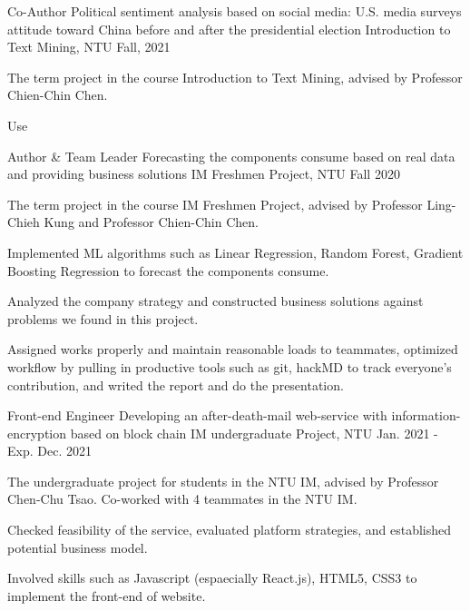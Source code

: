 \begin{cventries}
  \cventry
  {Co-Author}
  {Political sentiment analysis based on social media:
  U.S. media surveys attitude toward China before and after
  the presidential election}
  {Introduction to Text Mining, NTU}
  {Fall, 2021}
  {
      \begin{cvitems}
      \item{The term project in the course Introduction to Text Mining,
          advised by Professor Chien-Chin Chen.}
      \item{Use}
      \end{cvitems}
  }
  \cventry
    {Author \& Team Leader} %
    {Forecasting the components consume based on real data and providing business solutions} %
    {IM Freshmen Project, NTU} %
    {Fall 2020} %
    {
      \begin{cvitems} %
        \item {The term project in the course IM Freshmen Project, 
            advised by Professor Ling-Chieh Kung and Professor Chien-Chin Chen.}
        \item {Implemented ML algorithms such as Linear Regression, Random Forest,
            Gradient Boosting Regression to forecast the components consume.}
        \item {Analyzed the company strategy and constructed business solutions
            against problems we found in this project.}
        \item {Assigned works properly and maintain reasonable loads to teammates,
            optimized workflow by pulling in productive tools such as git, hackMD
            to track everyone's contribution, and writed the report and do the presentation.}
      \end{cvitems}
    }
  \cventry
    {Front-end Engineer} %
    {Developing an after-death-mail web-service with information-encryption based on block chain} %
    {IM undergraduate Project, NTU} %
    {Jan. 2021 - Exp. Dec. 2021} %
    {
      \begin{cvitems} %
        \item {The undergraduate project for students in the NTU IM,
            advised by Professor Chen-Chu Tsao. Co-worked with 4 teammates in the NTU IM.}
        \item {Checked feasibility of the service, evaluated platform strategies,
            and established potential business model.}
        \item {Involved skills such as Javascript (espaecially React.js),
            HTML5, CSS3 to implement the front-end of website.}
      \end{cvitems}
    }    

\end{cventries}
